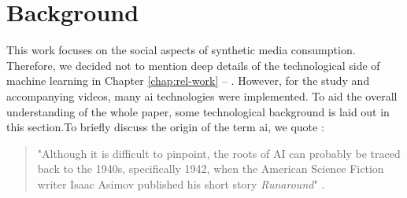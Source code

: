 \documentclass[
  a4paper,  %
  twoside,  %
  bibliography=totoc,
  headsepline,
  cleardoublepage=empty,
  parskip=half,
  draft=false
]{scrbook}
\begin{document}
\chapter{Background}
\label{chap:background}
This work focuses on the social aspects of synthetic media consumption. Therefore, we decided not to mention deep details of the technological side of machine learning in Chapter \ref{chap:rel-work} – . However, for the study and accompanying videos, many \gls{ai} technologies were implemented. To aid the overall understanding of the whole paper, some technological background is laid out in this section.To briefly discuss the origin of the term \gls{ai}, we quote \citeauthor{haenleinBriefHistoryArtificial2019}:

\begin{quotation}
"Although it is difficult to pinpoint, the roots of AI can probably be traced back to the 1940s, specifically 1942, when the American Science Fiction writer Isaac Asimov published his short story \textit{Runaround}" \cite{haenleinBriefHistoryArtificial2019}. 
\end{quotation}
\end{document}
